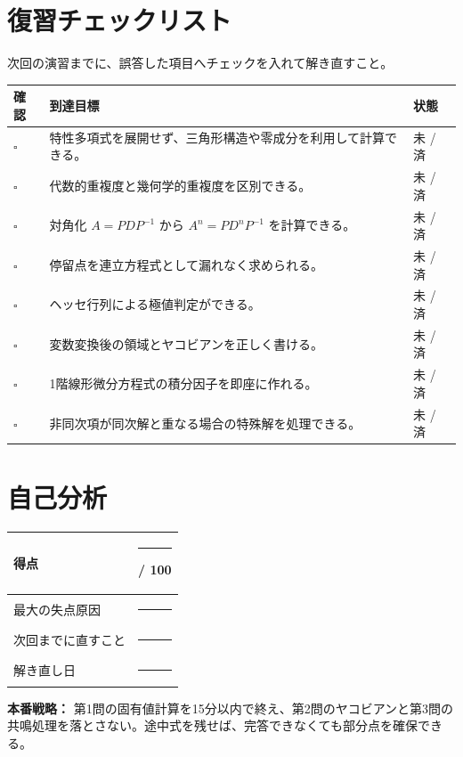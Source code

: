 \section*{復習チェックリスト}
\begin{examinfo}
次回の演習までに、誤答した項目へチェックを入れて解き直すこと。
\end{examinfo}

\vspace{4mm}
\begin{tabularx}{\textwidth}{>{\centering\arraybackslash}p{8mm} X >{\centering\arraybackslash}p{24mm}}
\toprule
確認 & 到達目標 & 状態 \\
\midrule
$\square$ & 特性多項式を展開せず、三角形構造や零成分を利用して計算できる。 & 未 / 済 \\
$\square$ & 代数的重複度と幾何学的重複度を区別できる。 & 未 / 済 \\
$\square$ & 対角化 $A=PDP^{-1}$ から $A^n=PD^nP^{-1}$ を計算できる。 & 未 / 済 \\
$\square$ & 停留点を連立方程式として漏れなく求められる。 & 未 / 済 \\
$\square$ & ヘッセ行列による極値判定ができる。 & 未 / 済 \\
$\square$ & 変数変換後の領域とヤコビアンを正しく書ける。 & 未 / 済 \\
$\square$ & 1階線形微分方程式の積分因子を即座に作れる。 & 未 / 済 \\
$\square$ & 非同次項が同次解と重なる場合の特殊解を処理できる。 & 未 / 済 \\
\bottomrule
\end{tabularx}

\vspace{8mm}
\section*{自己分析}
\begin{tabularx}{\textwidth}{p{35mm} X}
\toprule
得点 & \rule{25mm}{0.4pt} / 100 \\
\midrule
最大の失点原因 & \rule{120mm}{0.4pt} \\
\addlinespace[5mm]
次回までに直すこと & \rule{120mm}{0.4pt} \\
\addlinespace[5mm]
解き直し日 & \rule{40mm}{0.4pt} \\
\bottomrule
\end{tabularx}

\vfill
\begin{center}
\begin{pointbox}[width=0.88\textwidth]
\centering
\textbf{本番戦略：} 第1問の固有値計算を15分以内で終え、第2問のヤコビアンと第3問の共鳴処理を落とさない。途中式を残せば、完答できなくても部分点を確保できる。
\end{pointbox}
\end{center}
